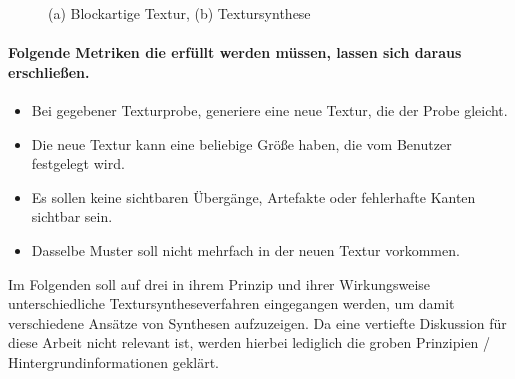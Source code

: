 \documentclass[12pt, a4paper,twoside,openany]{report} %
\begin{document}
\begin{figure}[H]
    \centering
    \qquad
    \caption{(a) Blockartige Textur, (b) Textursynthese}%
\end{figure}

\paragraph{Folgende Metriken die erfüllt werden müssen, lassen sich daraus erschließen.}

\begin{itemize}
    \item Bei gegebener Texturprobe, generiere eine neue Textur, die der Probe gleicht.
    \item Die neue Textur kann eine beliebige Größe haben, die vom Benutzer festgelegt wird.
    \item Es sollen keine sichtbaren Übergänge, Artefakte oder fehlerhafte Kanten sichtbar sein.
    \item Dasselbe Muster soll nicht mehrfach in der neuen Textur vorkommen. \cite[S.2]{GomathiShah2009}
\end{itemize}

Im Folgenden soll auf drei in ihrem Prinzip und ihrer Wirkungsweise unterschiedliche Textursyntheseverfahren eingegangen werden,
um damit verschiedene Ansätze von Synthesen aufzuzeigen.
Da eine vertiefte Diskussion für diese Arbeit nicht relevant ist, werden hierbei lediglich die groben Prinzipien / Hintergrundinformationen geklärt.
\end{document}
